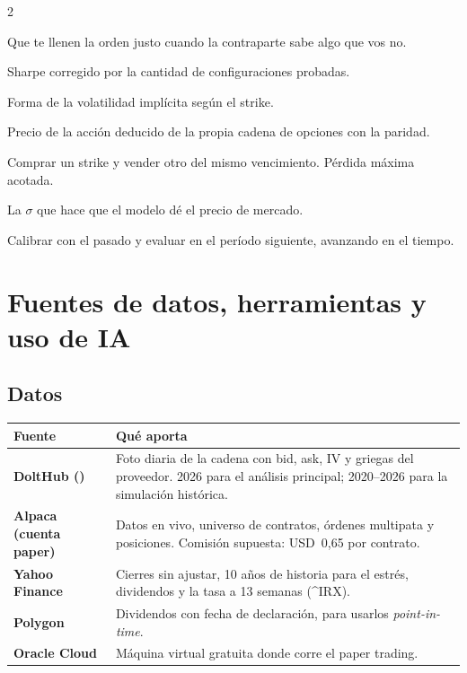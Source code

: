 \documentclass[11pt,a4paper]{article}
\newcommand{\code}[1]{\texttt{\detokenize{#1}}}
\newcommand{\usd}[1]{USD~#1}
\begin{document}
\begin{multicols}{2}
\begin{description}[leftmargin=0pt,style=nextline,itemsep=0.4em,font=\sffamily\bfseries\color{navy}]
\item[Selección adversa] Que te llenen la orden justo cuando la contraparte sabe algo que vos no.
\item[Sharpe deflactado] Sharpe corregido por la cantidad de configuraciones probadas.
\item[Sonrisa (smile/skew)] Forma de la volatilidad implícita según el strike.
\item[Spot implícito] Precio de la acción deducido de la propia cadena de opciones con la paridad.
\item[Vertical] Comprar un strike y vender otro del mismo vencimiento. Pérdida máxima acotada.
\item[Volatilidad implícita] La $\sigma$ que hace que el modelo dé el precio de mercado.
\item[Walk-forward] Calibrar con el pasado y evaluar en el período siguiente, avanzando en el tiempo.
\end{description}
\end{multicols}

\newpage
\section{Fuentes de datos, herramientas y uso de IA}

\subsection{Datos}

\begin{center}
\small
\begin{tabularx}{\linewidth}{@{}>{\sffamily\bfseries}lX@{}}
\toprule
Fuente & Qué aporta \\
\midrule
DoltHub (\code{post-no-preference/options}) & Foto diaria de la cadena con bid, ask, IV y griegas del proveedor. 2026 para el análisis principal; 2020–2026 para la simulación histórica. \\
Alpaca (cuenta paper) & Datos en vivo, universo de contratos, órdenes multipata y posiciones. Comisión supuesta: \usd{0,65} por contrato. \\
Yahoo Finance & Cierres sin ajustar, 10 años de historia para el estrés, dividendos y la tasa a 13 semanas (\^{}IRX). \\
Polygon & Dividendos con fecha de declaración, para usarlos \emph{point-in-time}. \\
Oracle Cloud & Máquina virtual gratuita donde corre el paper trading. \\
\bottomrule
\end{tabularx}
\end{center}
\end{document}
